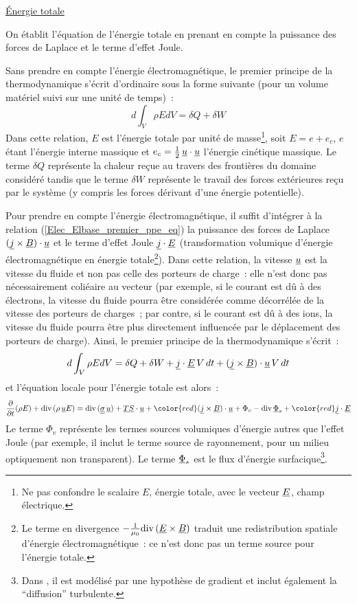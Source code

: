 \underline{Énergie totale}
\nopagebreak

On établit l'équation de l'énergie totale en prenant en compte la
puissance des forces de Laplace et le terme
d'effet Joule.

Sans prendre en compte l'énergie électromagnétique,
le premier principe de la thermodynamique s'écrit d'ordinaire sous la
forme suivante (pour un volume matériel suivi sur une unité de temps)~:
\begin{equation}\label{Elec_Elbase_premier_ppe_eq}
d\int_V \rho E dV=\delta Q+\delta W
\end{equation}
Dans cette relation, $E$ est l'énergie totale par unité de masse\footnote{Ne pas
confondre le scalaire $E$, énergie totale, avec le vecteur $\underline{E}$, champ
électrique.}, soit $E=e+e_c$, $e$ étant l'énergie interne massique et
$e_c=\frac{1}{2}\,\underline{u}\cdot\underline{u}$ l'énergie cinétique massique. Le terme
$\delta Q$  représente  la chaleur reçue au travers des frontières du
domaine considéré tandis que le terme  $\delta W$ représente le travail
des forces extérieures reçu par le système (y compris les forces
dérivant d'une énergie potentielle).

Pour prendre en compte l'énergie électromagnétique, il suffit d'intégrer
à la relation (\ref{Elec_Elbase_premier_ppe_eq}) la puissance des forces de Laplace $(\underline{j} \times
\underline{B})\cdot\underline{u}$ et le terme d'effet Joule $\underline{j}\cdot\underline{E}$
(transformation volumique d'énergie électromagnétique en énergie
totale\footnote{Le terme en divergence
$-\frac{1}{\mu_0}\text{div}\,(\underline{E}\times\underline{B})$
traduit une redistribution spatiale d'énergie électromagnétique~:
ce n'est donc pas un terme source pour l'énergie totale.}).
Dans cette relation, la vitesse $\underline{u}$ est la vitesse du fluide et non pas
celle des porteurs de charge~: elle n'est donc pas nécessairement coliéaire
au vecteur  (par exemple, si le courant est dû à des électrons,
la vitesse du fluide pourra être considérée comme décorrélée de la
vitesse des porteurs de charges~; par contre, si le courant est dû à des ions,
la vitesse du fluide pourra être plus directement influencée par
le déplacement des porteurs de charge).
Ainsi, le premier principe de la thermodynamique s'écrit~:
\begin{equation}
d\int_V \rho E dV=\delta Q+\delta W+\underline{j}\cdot\underline{E}\,V\,dt +(\underline{j} \times
\underline{B})\cdot\underline{u}\,V\,dt
\end{equation}
et l'équation locale pour l'énergie totale est alors~:
\begin{equation}
\displaystyle\frac{\partial}{\partial t}(\rho E)
+\dive(\rho\, \vect{u} E)
=\dive(\tens{\sigma}\,\vect{u}) + \vect{TS}\cdot\vect{u} + {\color{red}(\vect{j} \times
\vect{B})\cdot\vect{u}} + \Phi_v - \dive{\vect{\Phi}_s} + {\color{red}\vect{j}\cdot \vect{E}}
\end{equation}
Le terme $\Phi_v$ représente les termes sources volumiques d'énergie
autres que l'effet Joule (par exemple, il inclut le terme source de
rayonnement, pour un milieu optiquement non transparent). Le terme $\underline{\Phi}_s$ est
le flux d'énergie surfacique\footnote{Dans \CS, il est modélisé par
une hypothèse de gradient et inclut également la ``diffusion'' turbulente.}.

